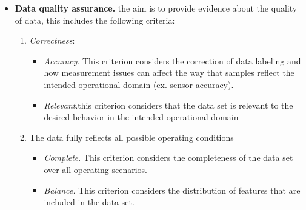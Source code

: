 \documentclass[a4paper, 11pt]{report}
\begin{document}
\begin{flushleft}
\begin{itemize}
    \item\textbf{Data quality assurance.} the aim is to provide evidence about the quality of data, this includes the following criteria:\\
    \begin{enumerate}
        \item \textit{Correctness}:\\
         \begin{itemize}
\item \textit{Accuracy}. This criterion considers the correction of data labeling and how measurement issues can affect the way that samples reflect the intended operational domain (ex. sensor accuracy).
\item \textit{Relevant}.this criterion considers that the data set is relevant to the desired behavior in the intended operational domain
         \end{itemize}
         \item The data fully reflects all possible operating conditions
         \begin{itemize}
             \item \textit{Complete}. This criterion considers the completeness of the data set over all operating scenarios.
             \item \textit{Balance.} This criterion considers the distribution of features that are included in the data set.
         \end{itemize}
    \end{enumerate}
   
    
\end{itemize}    
\end{flushleft}
\end{document}
